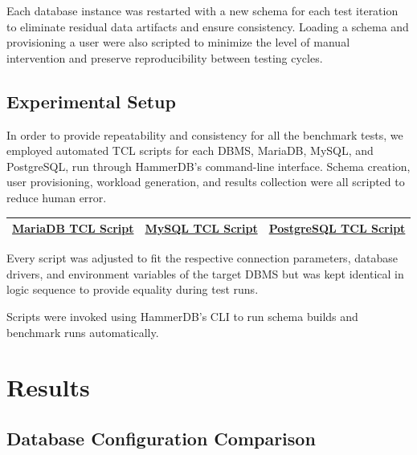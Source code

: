 Each database instance was restarted with a new schema for each test iteration to eliminate residual data artifacts and ensure consistency. Loading a schema and provisioning a user were also scripted to minimize the level of manual intervention and preserve reproducibility between testing cycles.

\subsection{Experimental Setup}

In order to provide repeatability and consistency for all the benchmark tests, we employed automated TCL scripts for each DBMS, MariaDB, MySQL, and PostgreSQL, run through HammerDB's command-line interface. Schema creation, user provisioning, workload generation, and results collection were all scripted to reduce human error.

\vspace{0.5cm}

\noindent
\begin{tabularx}{\textwidth}{|>{\centering\arraybackslash}X|>{\centering\arraybackslash}X|>{\centering\arraybackslash}X|}
    \hline
    \hyperref[sec:tcl-mariadb]{MariaDB TCL Script} &
    \hyperref[sec:tcl-mysql]{MySQL TCL Script} &
    \hyperref[sec:tcl-postgresql]{PostgreSQL TCL Script} \\
    \hline
\end{tabularx}

\vspace{0.5cm}

Every script was adjusted to fit the respective connection parameters, database drivers, and environment variables of the target DBMS but was kept identical in logic sequence to provide equality during test runs.

Scripts were invoked using HammerDB's CLI to run schema builds and benchmark runs automatically. 

\section{Results}
\label{sec:results}

\subsection{Database Configuration Comparison}

